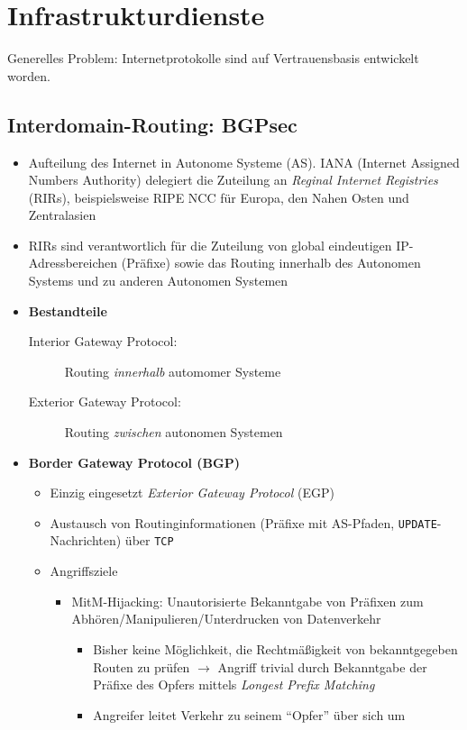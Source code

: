\section{Infrastrukturdienste}
Generelles Problem: Internetprotokolle sind auf Vertrauensbasis entwickelt worden.

\subsection{Interdomain-Routing: BGPsec}
\begin{itemize}
	\item Aufteilung des Internet in Autonome Systeme (AS). IANA (Internet Assigned Numbers Authority) delegiert die Zuteilung an \textit{Reginal Internet Registries} (RIRs), beispielsweise RIPE NCC für Europa, den Nahen Osten und Zentralasien
	\item RIRs sind verantwortlich für die Zuteilung von global eindeutigen IP-Adressbereichen (Präfixe) sowie das Routing innerhalb des Autonomen Systems und zu anderen Autonomen Systemen
	\item \textbf{Bestandteile}
	\begin{description}
		\item[Interior Gateway Protocol:] Routing \textit{innerhalb} automomer Systeme
		\item[Exterior Gateway Protocol:] Routing \textit{zwischen} autonomen Systemen
	\end{description}
	\item \textbf{Border Gateway Protocol (BGP)}
	\begin{itemize}
		\item Einzig eingesetzt \textit{Exterior Gateway Protocol} (EGP)
		\item Austausch von Routinginformationen (Präfixe mit AS-Pfaden, \texttt{UPDATE}-Nachrichten) über \texttt{TCP}
		\item Angriffsziele
		\begin{itemize}
			\item MitM-Hijacking: Unautorisierte Bekanntgabe von Präfixen zum Abhören/Manipulieren/Unterdrucken von Datenverkehr
			\begin{itemize}
				\item Bisher keine Möglichkeit, die Rechtmäßigkeit von bekanntgegeben Routen zu prüfen \(\rightarrow\) Angriff trivial durch Bekanntgabe der Präfixe des Opfers mittels \textit{Longest Prefix Matching}
				\item Angreifer leitet Verkehr zu seinem "`Opfer"' über sich um

\end{itemize}
\end{itemize}
\end{itemize}
\end{itemize}
